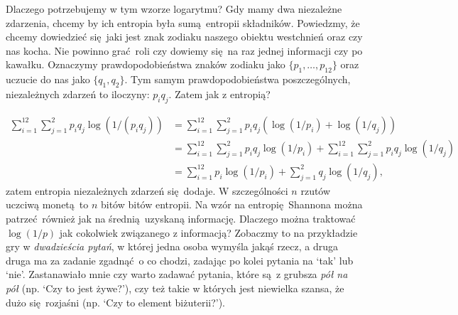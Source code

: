 \documentclass[10pt,a4paper]{article}
\begin{document}

Dlaczego potrzebujemy w tym wzorze logarytmu? 
Gdy mamy dwa niezależne zdarzenia, chcemy by ich entropia była sumą entropii składników.
Powiedzmy, że chcemy dowiedzieć się jaki jest znak zodiaku naszego obiektu westchnień oraz czy nas kocha.
Nie powinno grać roli czy dowiemy się na raz jednej informacji czy po kawałku.
Oznaczymy prawdopodobieństwa znaków zodiaku jako $\{p_1, \ldots, p_{12} \}$ oraz uczucie do nas jako $\{q_1, q_2\}$.
Tym samym prawdopodobieństwa poszczególnych, niezależnych zdarzeń to iloczyny: $p_i q_j$.
Zatem jak z entropią?
%
%

\begin{align}
    \sum_{i=1}^{12} \sum_{j=1}^2 p_i q_j \log(1/(p_i q_j))
    &= \sum_{i=1}^{12} \sum_{j=1}^2 p_i q_j \left( \log(1/p_i) + \log(1/q_j) \right)\\
    &= \sum_{i=1}^{12} \sum_{j=1}^2 p_i q_j \log(1/p_i)
    +\sum_{i=1}^{12} \sum_{j=1}^2 p_i q_j \log(1/q_j)\\
    &= \sum_{i=1}^{12} p_i \log(1/p_i)
    + \sum_{j=1}^2 q_j \log(1/q_j),
\end{align}
%
zatem entropia niezależnych zdarzeń się dodaje.
W szczególności $n$ rzutów uczciwą monetą to $n$ bitów bitów entropii.
%
%
Na wzór na entropię Shannona można patrzeć również jak na średnią uzyskaną informację.
Dlaczego można traktować $\log(1/p)$ jak cokolwiek związanego z informacją?
Zobaczmy to na przykładzie gry w \emph{dwadzieścia pytań}, w której jedna osoba wymyśla jakąś rzecz, a druga druga ma za zadanie zgadnąć o co chodzi, zadając po kolei pytania na `tak' lub `nie'.
Zastanawiało mnie czy warto zadawać pytania, które są z grubsza \emph{pół na pół} (np. `Czy to jest żywe?'), czy też takie w których jest niewielka szansa, że dużo się rozjaśni (np. `Czy to element biżuterii?').
\end{document}
